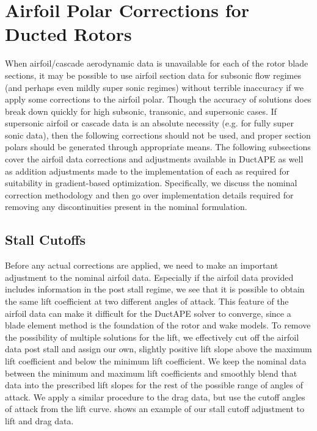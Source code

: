 \section{Airfoil Polar Corrections for Ducted Rotors}

When airfoil/cascade aerodynamic data is unavailable for each of the rotor blade sections, it may be possible to use airfoil section data for subsonic flow regimes (and perhaps even mildly super sonic regimes) without terrible inaccuracy if we apply some corrections to the airfoil polar.
%
Though the accuracy of solutions does break down quickly for high subsonic, transonic, and supersonic cases.
%
If supersonic airfoil or cascade data is an absolute necessity (e.g. for fully super sonic data), then the following corrections should not be used, and proper section polars should be generated through appropriate means.
%
The following subsections cover the airfoil data corrections and adjustments available in DuctAPE as well as addition adjustments made to the implementation of each as required for suitability in gradient-based optimization.
%
Specifically, we discuss the nominal correction methodology and then go over implementation details required for removing any discontinuities present in the nominal formulation.


\subsection{Stall Cutoffs}
Before any actual corrections are applied, we need to make an important adjustment to the nominal airfoil data.
%
Especially if the airfoil data provided includes information in the post stall regime, we see that it is possible to obtain the same lift coefficient at two different angles of attack.
%
This feature of the airfoil data can make it difficult for the DuctAPE solver to converge, since a blade element method is the foundation of the rotor and wake models.
%
To remove the possibility of multiple solutions for the lift, we effectively cut off the airfoil data post stall and assign our own, slightly positive lift slope above the maximum lift coefficient and below the minimum lift coefficient.
%
We keep the nominal data between the minimum and maximum lift coefficients and smoothly blend that data into the prescribed lift slopes for the rest of the possible range of angles of attack.
%
We apply a similar procedure to the drag data, but use the cutoff angles of attack from the lift curve.
%
 shows an example of our stall cutoff adjustment to lift and drag data.

